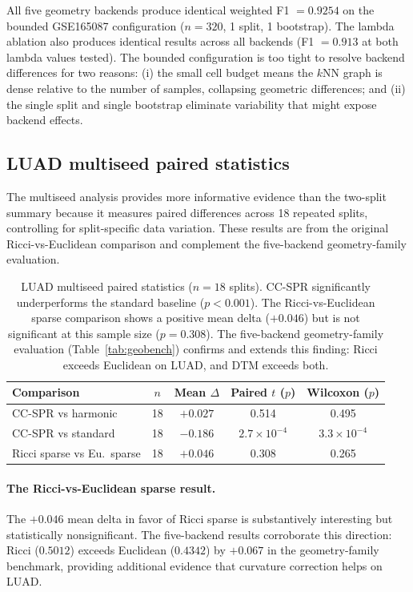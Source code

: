 \documentclass[11pt]{article}
\begin{document}
All five geometry backends produce identical weighted F1 $= 0.9254$ on the bounded GSE165087 configuration ($n = 320$, 1 split, 1 bootstrap).
The lambda ablation also produces identical results across all backends (F1 $= 0.913$ at both lambda values tested).
The bounded configuration is too tight to resolve backend differences for two reasons: (i) the small cell budget means the $k$NN graph is dense relative to the number of samples, collapsing geometric differences; and (ii) the single split and single bootstrap eliminate variability that might expose backend effects.

\subsection{LUAD multiseed paired statistics}

The multiseed analysis provides more informative evidence than the two-split summary because it measures paired differences across 18 repeated splits, controlling for split-specific data variation.
These results are from the original Ricci-vs-Euclidean comparison and complement the five-backend geometry-family evaluation.

\begin{table}[h]
\centering
\small
\begin{tabular}{lcccc}
\toprule
Comparison & $n$ & Mean $\Delta$ & Paired $t$ ($p$) & Wilcoxon ($p$) \\
\midrule
CC-SPR vs harmonic & 18 & $+0.027$ & 0.514 & 0.495 \\
CC-SPR vs standard & 18 & $-0.186$ & $2.7 \times 10^{-4}$ & $3.3 \times 10^{-4}$ \\
Ricci sparse vs Eu.\ sparse & 18 & $+0.046$ & 0.308 & 0.265 \\
\bottomrule
\end{tabular}
\caption{LUAD multiseed paired statistics ($n=18$ splits).
CC-SPR significantly underperforms the standard baseline ($p < 0.001$).
The Ricci-vs-Euclidean sparse comparison shows a positive mean delta ($+0.046$) but is not significant at this sample size ($p = 0.308$).
The five-backend geometry-family evaluation (Table~\ref{tab:geobench}) confirms and extends this finding: Ricci exceeds Euclidean on LUAD, and DTM exceeds both.}
\label{tab:paired}
\end{table}

\paragraph{The Ricci-vs-Euclidean sparse result.}
The $+0.046$ mean delta in favor of Ricci sparse is substantively interesting but statistically nonsignificant.
The five-backend results corroborate this direction: Ricci ($0.5012$) exceeds Euclidean ($0.4342$) by $+0.067$ in the geometry-family benchmark, providing additional evidence that curvature correction helps on LUAD.
\end{document}
